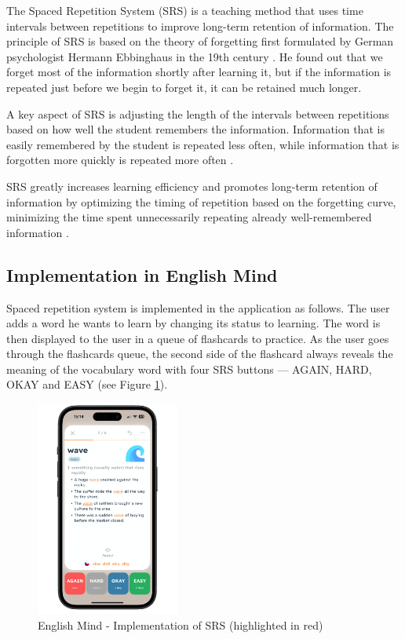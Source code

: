 The Spaced Repetition System (SRS) is a teaching method that uses time intervals between repetitions to improve long-term retention of information. The principle of SRS is based on the theory of forgetting first formulated by German psychologist Hermann Ebbinghaus in the 19th century \cite{cite:ebbinghaus2013_memory_contribution_to_experimantal_psychology}. He found out that we forget most of the information shortly after learning it, but if the information is repeated just before we begin to forget it, it can be retained much longer.

A key aspect of SRS is adjusting the length of the intervals between repetitions based on how well the student remembers the information. Information that is easily remembered by the student is repeated less often, while information that is forgotten more quickly is repeated more often \cite{cite:kang2016_spaced_repetiton_promotes_efficient_learning}.

SRS greatly increases learning efficiency and promotes long-term retention of information by optimizing the timing of repetition based on the forgetting curve, minimizing the time spent unnecessarily repeating already well-remembered information \cite{cite:kang2016_spaced_repetiton_promotes_efficient_learning}.

\subsection*{Implementation in English Mind}

Spaced repetition system is implemented in the application as follows. The user adds a word he wants to learn by changing its status to learning. The word is then displayed to the user in a queue of flashcards to practice. As the user goes through the flashcards queue, the second side of the flashcard always reveals the meaning of the vocabulary word with four SRS buttons — AGAIN, HARD, OKAY and EASY (see Figure \ref{fig:em-srs-flashcard}).

\begin{figure}[!h]
    \includegraphics[width=0.42\textwidth]{src/figures/em-srs-flashcard.png}
    \caption{English Mind - Implementation of SRS (highlighted in red)}
    \label{fig:em-srs-flashcard}
\end{figure}


